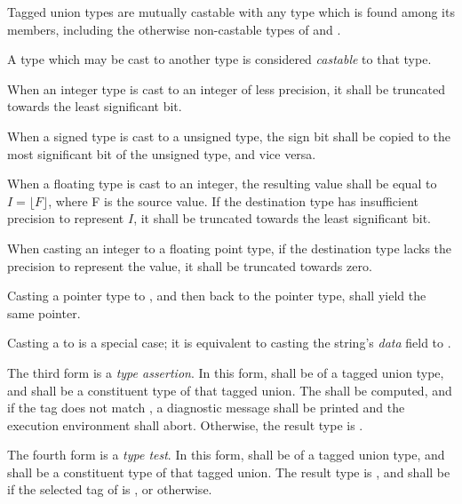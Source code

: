 Tagged union types are mutually castable with any type which is found among its
members, including the otherwise non-castable types of  and
.

A type which may be cast to another type is considered \textit{castable} to
that type.

\specsubsubitem
When an integer type is cast to an integer of less precision, it shall be
truncated towards the least significant bit.

\specsubsubitem
When a signed type is cast to a unsigned type, the sign bit shall be copied to
the most significant bit of the unsigned type, and vice versa.

\specsubsubitem
When a floating type is cast to an integer, the resulting value shall be equal
to $I = \lfloor F \rfloor$, where F is the source value. If the destination type
has insufficient precision to represent $I$, it shall be truncated towards the
least significant bit.

\specsubsubitem
When casting an integer to a floating point type, if the destination type
lacks the precision to represent the value, it shall be truncated towards zero.

\specsubsubitem
Casting a pointer type to , and then back to the pointer
type, shall yield the same pointer.


\specsubsubitem
Casting a  to \terminal{*}  is a special case; it
is equivalent to casting the string's \textit{data} field to \terminal{*}
.

\specsubsubitem
The third form is a \textit{type assertion}. In this form,
 shall be of a tagged union type, and
 shall be a constituent type of that tagged union. The
 shall be computed, and if the tag does not match
, a diagnostic message shall be printed and the execution
environment shall abort. Otherwise, the result type is .

\specsubsubitem
The fourth form is a \textit{type test}. In this form,
 shall be of a tagged union type, and
 shall be a constituent type of that tagged union. The result
type is , and shall be  if the selected tag of
 is , or 
otherwise.

